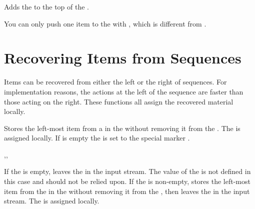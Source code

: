 \documentclass[oneside]{book}
\begin{document}
\begin{function}{\SeqPush}
\begin{syntax}
  
\end{syntax}
Adds the  to the top of the .
\begin{demohigh}
\SeqSetFromClist {}
\SeqPush {}
\SeqVarJoin \lTmpaSeq {|}
\end{demohigh}
You can only push one item to the  with ,
which is different from .
\end{function}

\section{Recovering Items from Sequences}

Items can be recovered from either the left or the right of sequences.
For implementation reasons, the actions at the left of the sequence are
faster than those acting on the right. These functions all assign the
recovered material locally.

\begin{function}{\SeqGetLeft}
\begin{syntax}
  
\end{syntax}
Stores the left-most item from a  in the
 without removing it from the
. The  is assigned locally.
If  is empty the 
is set to the special marker .
\begin{demohigh}
\SeqSetFromClist {}
\SeqGetLeft \lTmpaSeq \lTmpaTl
\TlUse \lTmpaTl
\end{demohigh}
\end{function}

\begin{function}{\SeqGetLeftT,\SeqGetLeftF,\SeqGetLeftTF}
\begin{syntax}
   
   
    
\end{syntax}
If the  is empty, leaves the  in the
input stream.  The value of the  is
not defined in this case and should not be relied upon.  If the
 is non-empty, stores the left-most item from the
in the  without removing it from the
, then leaves the  in the input stream.
The  is assigned locally.
\begin{demohigh}
\SeqSetFromClist {}
\SeqGetLeftTF \lTmpaSeq {} {}
\end{demohigh}
\end{function}
\end{document}

